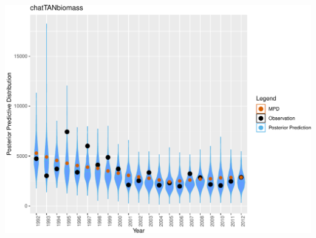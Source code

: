 \documentclass[
]{book}
\begin{document}
\includegraphics{_main_files/figure-latex/ggplots_ppp-1.pdf}
\end{document}
